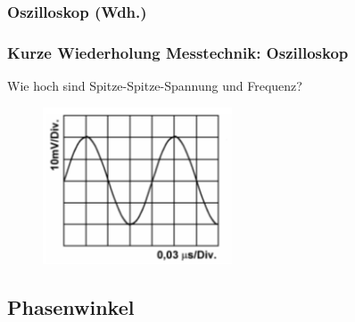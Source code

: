 \subsubsection{Oszilloskop (Wdh.)}

\begin{frame}
  \frametitle{Kurze Wiederholung Messtechnik: Oszilloskop}


  \begin{block}{
    Wie hoch sind Spitze-Spitze-Spannung und Frequenz?
    \begin{center}
      \begin{figure}
        \includegraphics[width=0.5\textwidth,height=.4\textheight,keepaspectratio]{a11/TB605.png}
      \end{figure}
    \end{center}
    }
  \end{block}

\end{frame}

\subsection{Phasenwinkel}

